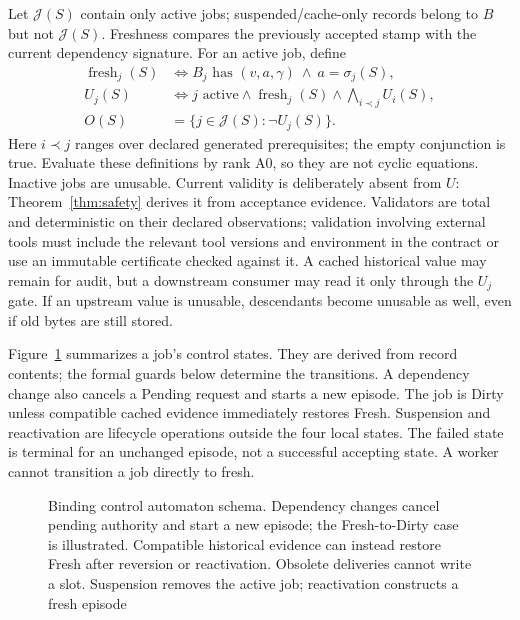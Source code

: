 \documentclass[pdflatex,sn-mathphys-num]{sn-jnl}
\theoremstyle{thmstyleone}
\theoremstyle{thmstylethree}
\theoremstyle{thmstyletwo}
\newcommand{\Jobs}{\mathcal J}
\newcommand{\Sig}{\sigma}
\newcommand{\fresh}{\operatorname{fresh}}
\begin{document}
Let $\Jobs(S)$ contain only active jobs; suspended/cache-only records belong to $B$ but not $\Jobs(S)$. Freshness compares the previously accepted stamp with the current dependency signature. For an active job, define
\begin{align}
\fresh_j(S)&\iff B_j\text{ has }(v,a,\gamma)\ \land\ a=\Sig_j(S),\label{eq:fresh}\\
U_j(S)&\iff j\text{ active}\land\fresh_j(S)\land\bigwedge_{i\prec j}U_i(S),\label{eq:usable}\\
O(S)&=\{j\in\Jobs(S):\neg U_j(S)\}.\label{eq:obligation}
\end{align}
Here $i\prec j$ ranges over declared generated prerequisites; the empty conjunction is true. Evaluate these definitions by rank A0, so they are not cyclic equations. Inactive jobs are unusable. Current validity is deliberately absent from $U$: Theorem~\ref{thm:safety} derives it from acceptance evidence. Validators are total and deterministic on their declared observations; validation involving external tools must include the relevant tool versions and environment in the contract or use an immutable certificate checked against it. A cached historical value may remain for audit, but a downstream consumer may read it only through the $U_j$ gate. If an upstream value is unusable, descendants become unusable as well, even if old bytes are still stored.

Figure~\ref{fig:automaton} summarizes a job's control states. They are derived from record contents; the formal guards below determine the transitions. A dependency change also cancels a Pending request and starts a new episode. The job is Dirty unless compatible cached evidence immediately restores Fresh. Suspension and reactivation are lifecycle operations outside the four local states. The failed state is terminal for an unchanged episode, not a successful accepting state. A worker cannot transition a job directly to fresh.
\begin{figure}[tb]
\centering
{}
\caption{Binding control automaton schema. Dependency changes cancel pending authority and start a new episode; the Fresh-to-Dirty case is illustrated. Compatible historical evidence can instead restore Fresh after reversion or reactivation. Obsolete deliveries cannot write a slot. Suspension removes the active job; reactivation constructs a fresh episode}\label{fig:automaton}
\end{figure}
\end{document}
